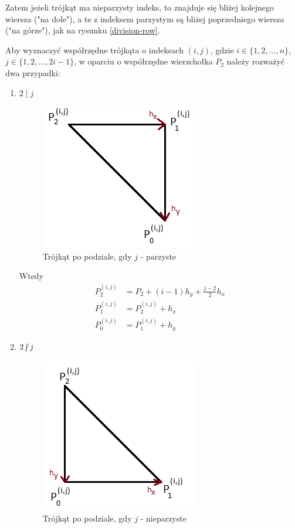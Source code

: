\documentclass[12pt]{article}
\begin{document}
	Zatem jeżeli trójkąt ma nieparzysty indeks, to znajduje się bliżej kolejnego wiersza ("na dole"), a te z indeksem parzystym są bliżej poprzedniego wiersza ("na górze"), jak na rysunku \ref{division-row}.
	
	Aby wyznaczyć współrzędne trójkąta o indeksach $(i, j)$, gdzie $i \in \{1, 2, \dots, n\}$, $j \in \{1, 2, \dots, 2i-1\}$, w oparciu o współrzędne wierzchołka $P_2$ należy rozważyć dwa przypadki:
	
	\begin{enumerate}[label=\textbf{\Roman*}]
		\item $2 \mid j$
		
		\begin{figure}[H]
			\centering
			\includegraphics[]{images/triangle-j-even.png}
			\caption{Trójkąt po podziale, gdy $j$ - parzyste}
			\label{triangle-j-even}
		\end{figure}
		
		Wtedy
		\begin{align*}
			P_2^{(i,j)} & = P_2 + (i-1)h_y + \frac{j-2}{2}h_x \\
			P_1^{(i,j)} & = P_2^{(i,j)} + h_x                 \\
			P_0^{(i,j)} & = P_1^{(i,j)} + h_y
		\end{align*}
		
		
		\pagebreak
		
		\item $2 \centernot\mid j$
		
		\begin{figure}[H]
			\centering
			\includegraphics[]{images/triangle-j-odd.png}
			\caption{Trójkąt po podziale, gdy $j$ - nieparzyste}
			\label{triangle-j-odd}
		\end{figure}
		

\end{enumerate}
\end{document}
